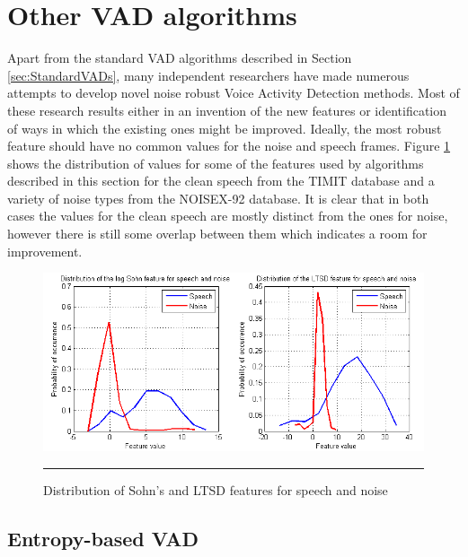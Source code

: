 
\section{Other VAD algorithms}
\label{sec:RobustVADs}

Apart from the standard VAD algorithms described in Section \ref{sec:StandardVADs}, many independent researchers have made numerous attempts to develop novel noise robust Voice Activity Detection methods. Most of these research results either in an invention of the new features or identification of ways in which the existing ones might be improved. Ideally, the most robust feature should have no common values for the noise and speech frames. Figure \ref{fig:featureDist} shows the distribution of values for some of the features used by algorithms described in this section for the clean speech from the TIMIT \cite{TIMIT} database and a variety of noise types from the NOISEX-92 \cite{NOISEX} database. It is clear that in both cases the values for the clean speech are mostly distinct from the ones for noise, however there is still some overlap between them which indicates a room for improvement.

\begin{figure}[htbp]
	\centering
		\includegraphics[width=0.9\columnwidth]{Figures/Chapter2/featureDist.png}
		\rule{37em}{0.5pt}
	\caption[Distribution of Sohn's and LTSD features for speech and noise]{Distribution of Sohn's \cite{SohnInitial} and LTSD \cite{LTSD} features for speech and noise}
	\label{fig:featureDist}
\end{figure}

\subsection{Entropy-based VAD}

